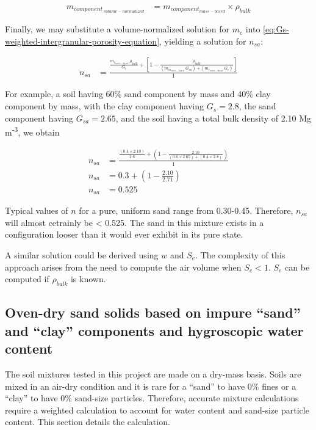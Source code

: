 \documentclass[
  letterpaper,
  openany]{book}
\begin{document}
\begin{align}
m_{component_{~volume-normalized}} &= m_{component_{mass-based}} \times \rho_{bulk}
\end{align}

Finally, we may substitute a volume-normalized solution for \(m_c\) into \eqref{eq:Gs-weighted-intergranular-porosity-equation}, yielding a solution for \(n_{sa}\):

\begin{align}
n_{sa}&=\frac{\frac{    m_{c_{mass-based}} ~ \rho_{bulk}    }{G_c}+\left[ 1 - \frac{\rho_{bulk}}{\left(  m_{sa_{mass-based}} ~ G_{sa}\right)  + \left( m_{c_{mass-based}} ~ G_c \right) } \right]}{1}
\label{eq:final-intergranular-porosity-equation}
\end{align}

For example, a soil having 60\% sand component by mass and 40\% clay component by mass, with the clay component having \(G_s=2.8\), the sand component having \(G_{sa}=2.65\), and the soil having a total bulk density of 2.10 Mg m\textsuperscript{-3}, we obtain

\begin{align*}
n_{sa} &= \frac{\frac{\left(0.4 \times  2.10 \right)}{2.8}+\left( 1 - \frac{2.10}{ \left( 0.6 \times 2.65  \right) + \left(  0.4 \times 2.8 \right)  } \right)}{1} \\
n_{sa} &= 0.3 + \left( 1 - \frac{2.10}{2.71} \right) \\
n_{sa} &= 0.525
\end{align*}

Typical values of \(n\) for a pure, uniform sand range from 0.30-0.45. Therefore, \(n_{sa}\) will almost cetrainly be \textless{} 0.525.
The sand in this mixture exists in a configuration looser than it would ever exhibit in its pure state.

A similar solution could be derived using \(w\) and \(S_e\).
The complexity of this approach arises from the need to compute the air volume when \(S_e<1\).
\(S_e\) can be computed if \(\rho_{bulk}\) is known.

\hypertarget{sand-clay-mix-calcs}{%
\subsection{Oven-dry sand solids based on impure ``sand'' and ``clay'' components and hygroscopic water content}\label{sand-clay-mix-calcs}}

The soil mixtures tested in this project are made on a dry-mass basis.
Soils are mixed in an air-dry condition and it is rare for a ``sand'' to have 0\% fines or a ``clay'' to have 0\% sand-size particles.
Therefore, accurate mixture calculations require a weighted calculation to account for water content and sand-size particle content.
This section details the calculation.
\end{document}
